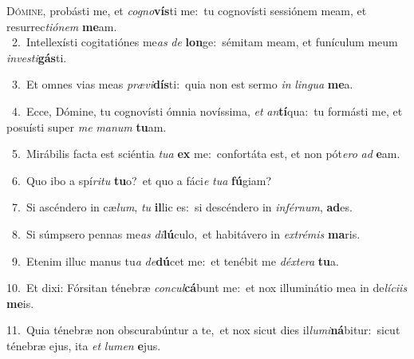 \lettrine{\initial\textcolor{\initialcolor}{D}}{ómine,} probásti me, et \textit{co}\-\textit{gno}\textbf{vís}ti me:~\star tu cognovísti sessiónem meam, et resurrec\-\textit{ti}\-\textit{ó}\textit{nem} \textbf{me}\-am.\\
{\numbfont\textcolor{\numbcolor}{~2.}}~Intellexísti cogitatiónes me\textit{as} \textit{de} \textbf{lon}\-ge:~\star sémitam meam, et funículum meum \textit{in}\-\textit{ves}\textit{ti}\textbf{gás}ti.\par
{\numbfont\textcolor{\numbcolor}{~3.}}~Et omnes vias meas \textit{præ}\-\textit{vi}\textbf{dís}ti:~\star quia non est sermo \textit{in} \textit{lin}\-\textit{gua} \textbf{me}\-a.\par
{\numbfont\textcolor{\numbcolor}{~4.}}~Ecce, Dómine, tu cognovísti ómnia novíssima, \textit{et} \textit{an}\-\textbf{tí}qua:~\star tu formásti me, et posuísti super \textit{me} \textit{ma}\-\textit{num} \textbf{tu}\-am.\par
{\numbfont\textcolor{\numbcolor}{~5.}}~Mirábilis facta est sciéntia \textit{tu}\-\textit{a} \textbf{ex} me:~\star confortáta est, et non pót\-\textit{e}\-\textit{ro} \textit{ad} \textbf{e}\-am.\par
{\numbfont\textcolor{\numbcolor}{~6.}}~Quo ibo a spí\-\textit{ri}\-\textit{tu} \textbf{tu}\-o?~\star et quo a fáci\textit{e} \textit{tu}\-\textit{a} \textbf{fú}\-giam?\par
{\numbfont\textcolor{\numbcolor}{~7.}}~Si ascéndero in cæ\-\textit{lum}\-, \textit{tu} \textbf{il}\-lic es:~\star si descéndero in \textit{in}\-\textit{fér}\textit{num}, \textbf{ad}\-es.\par
{\numbfont\textcolor{\numbcolor}{~8.}}~Si súmpsero pennas me\textit{as} \textit{di}\-\textbf{lú}culo,~\star et habitávero in \textit{ex}\-\textit{tré}\textit{mis} \textbf{ma}\-ris.\par
{\numbfont\textcolor{\numbcolor}{~9.}}~Etenim illuc manus tu\textit{a} \textit{de}\-\textbf{dú}cet me:~\star et tenébit me \textit{déx}\-\textit{te}\textit{ra} \textbf{tu}\-a.\par
{\numbfont\textcolor{\numbcolor}{10.}}~Et dixi: Fórsitan ténebræ \textit{con}\-\textit{cul}\textbf{cá}bunt me:~\star et nox illuminátio mea in de\-\textit{lí}\-\textit{ci}\textit{is} \textbf{me}\-is.\par
{\numbfont\textcolor{\numbcolor}{11.}}~Quia ténebræ non obscurabúntur a te,~\dagger et nox sicut dies il\-\textit{lu}\-\textit{mi}\textbf{ná}bitur:~\star sicut ténebræ ejus, ita \textit{et} \textit{lu}\-\textit{men} \textbf{e}\-jus.\par
